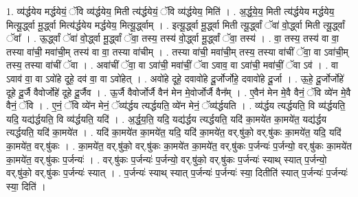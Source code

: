 \documentclass[17pt]{extarticle}
\begin{document}
1. व्य॑र्द्धयेय मर्द्धयेयं॒ ॅवि व्य॑र्द्धयेय॒ मिती त्य॑र्द्धयेयं॒ ॅवि व्य॑र्द्धयेय॒ मिति॑ । . अ॒र्द्ध॒ये॒य॒ मिती त्य॑र्द्धयेय मर्द्धयेय॒ मित्यू॒र्द्ध्वा मू॒र्द्ध्वा मित्य॑र्द्धयेय मर्द्धयेय॒ मित्यू॒र्द्ध्वाम् । . इत्यू॒र्द्ध्वा मू॒र्द्ध्वा मिती त्यू॒र्द्ध्वां ॅवा॑ वो॒र्द्ध्वा मिती त्यू॒र्द्ध्वां ॅवा᳚ । . ऊ॒र्द्ध्वां ॅवा॑ वो॒र्द्ध्वा मू॒र्द्ध्वां ॅवा॒ तस्य॒ तस्य॑ वो॒र्द्ध्वा मू॒र्द्ध्वां ॅवा॒ तस्य॑ । . वा॒ तस्य॒ तस्य॑ वा वा॒ तस्या वा॑ची॒ मवा॑ची॒म् तस्य॑ वा वा॒ तस्या वा॑चीम् । . तस्या वा॑ची॒ मवा॑ची॒म् तस्य॒ तस्या वा॑चीं ॅवा॒ वा ऽवा॑ची॒म् तस्य॒ तस्या वा॑चीं ॅवा । . अवा॑चीं ॅवा॒ वा ऽवा॑ची॒ मवा॑चीं॒ ॅवा ऽवाव॒ वा ऽवा॑ची॒ मवा॑चीं॒ ॅवा ऽव॑ । . वा ऽवाव॑ वा॒ वा ऽवो॑हे दूहे॒ दव॑ वा॒ वा ऽवो॑हेत् । . अवो॑हे दूहे॒ दवावो॑हे दू॒र्जोर्जोहे॒ दवावो॑हे दू॒र्जा । . ऊ॒हे॒ दू॒र्जोर्जोहे॑ दूहे दू॒र्जै वैवोर्जोहे॑ दूहे दू॒र्जैव । . ऊ॒र्जै वैवोर्जोर्जै वैन॑ मेन मे॒वोर्जोर्जै वैन᳚म् । . ए॒वैन॑ मेन मे॒वै वैनं॒ ॅवि व्ये॑न मे॒वै वैनं॒ ॅवि । . ए॒नं॒ ॅवि व्ये॑न मेनं॒ ॅव्य॑र्द्धय त्यर्द्धयति॒ व्ये॑न मेनं॒ ॅव्य॑र्द्धयति । . व्य॑र्द्धय त्यर्द्धयति॒ वि व्य॑र्द्धयति॒ यदि॒ यद्य॑र्द्धयति॒ वि व्य॑र्द्धयति॒ यदि॑ । . अ॒र्द्ध॒य॒ति॒ यदि॒ यद्य॑र्द्धय त्यर्द्धयति॒ यदि॑ का॒मये॑त का॒मये॑त॒ यद्य॑र्द्धय त्यर्द्धयति॒ यदि॑ का॒मये॑त । . यदि॑ का॒मये॑त का॒मये॑त॒ यदि॒ यदि॑ का॒मये॑त॒ वर्.षु॑को॒ वर्.षु॑कः का॒मये॑त॒ यदि॒ यदि॑ का॒मये॑त॒ वर्.षु॑कः । . का॒मये॑त॒ वर्.षु॑को॒ वर्.षु॑कः का॒मये॑त का॒मये॑त॒ वर्.षु॑कः प॒र्जन्यः॑ प॒र्जन्यो॒ वर्.षु॑कः का॒मये॑त का॒मये॑त॒ वर्.षु॑कः प॒र्जन्यः॑ । . वर्.षु॑कः प॒र्जन्यः॑ प॒र्जन्यो॒ वर्.षु॑को॒ वर्.षु॑कः प॒र्जन्यः॑ स्याथ् स्यात् प॒र्जन्यो॒ वर्.षु॑को॒ वर्.षु॑कः प॒र्जन्यः॑ स्यात् । . प॒र्जन्यः॑ स्याथ् स्यात् प॒र्जन्यः॑ प॒र्जन्यः॑ स्या॒ दितीति॑ स्यात् प॒र्जन्यः॑ प॒र्जन्यः॑ स्या॒ दिति॑ । \newline
\end{document}
